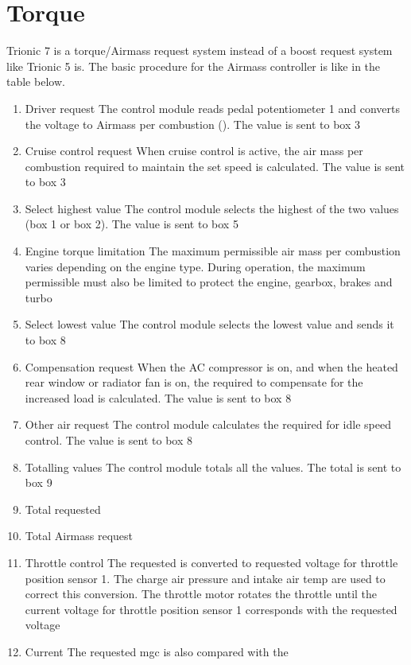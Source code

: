 \documentclass[11pt,a4paper]{book}
\begin{document}
\section{Torque}
Trionic 7 is a torque/Airmass request system instead of a boost request system like Trionic 5 is.
The basic procedure for the Airmass controller is like in the table below.
\begin{enumerate}
    \item  Driver request The control module reads pedal potentiometer 1 and converts the
        voltage to Airmass per combustion (\si{\mgc}). The value is sent to box 3
    \item Cruise control request When cruise control is active, the air mass per combustion required to
        maintain the set speed is calculated. The value is sent to box 3
    \item Select highest value The control module selects the highest of the two values (box 1 or box
        2). The value is sent to box 5
    \item Engine torque limitation The maximum permissible air mass per combustion varies depending
        on the engine type. During operation, the maximum permissible \si{\mgc}
        must also be limited to protect the engine, gearbox, brakes and turbo
    \item Select lowest value The control module selects the lowest value and sends it to box 8
    \item Compensation request When the AC compressor is on, and when the heated rear window or
        radiator fan is on, the \si{\mgc} required to compensate for the increased
        load is calculated. The value is sent to box 8
    \item Other air request The control module calculates the \si{\mgc} required for idle speed control.
        The value is sent to box 8
    \item Totalling values The control module totals all the values. The total is sent to box 9
    \item Total requested \si{\mgc}
    \item Total Airmass request
    \item Throttle control The requested \si{\mgc} is converted to requested voltage for throttle
        position sensor 1. The charge air pressure and intake air temp are
        used to correct this conversion. The throttle motor rotates the throttle
        until the current voltage for throttle position sensor 1 corresponds with
        the requested voltage
    \item Current \si{\mgc} The requested \si{mgc} is also compared with the

\end{enumerate}
\end{document}
